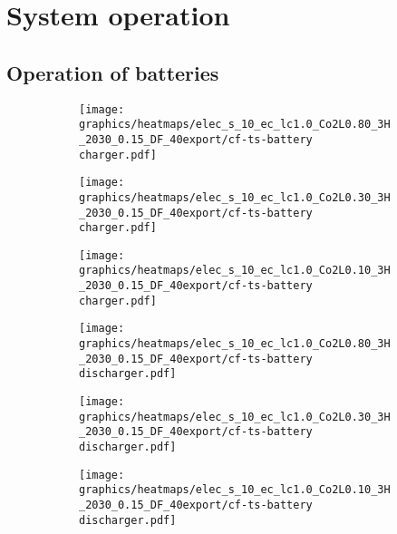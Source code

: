 \section{System operation}

\subsection{Operation of batteries}


\begin{figure}[h]
    \centering
        \begin{subfigure}[h]{0.33\textwidth}
            \centering
        \texttt{[image: graphics/heatmaps/elec\_s\_10\_ec\_lc1.0\_Co2L0.80\_3H\_2030\_0.15\_DF\_40export/cf-ts-battery charger.pdf]}
    \end{subfigure}
    \begin{subfigure}[h]{0.33\textwidth}
        \centering
        \texttt{[image: graphics/heatmaps/elec\_s\_10\_ec\_lc1.0\_Co2L0.30\_3H\_2030\_0.15\_DF\_40export/cf-ts-battery charger.pdf]}
    \end{subfigure}
    \begin{subfigure}[h]{0.33\textwidth}
        \centering
        \texttt{[image: graphics/heatmaps/elec\_s\_10\_ec\_lc1.0\_Co2L0.10\_3H\_2030\_0.15\_DF\_40export/cf-ts-battery charger.pdf]}
    \end{subfigure}


    \begin{subfigure}[h]{0.33\textwidth}
        \centering
        \texttt{[image: graphics/heatmaps/elec\_s\_10\_ec\_lc1.0\_Co2L0.80\_3H\_2030\_0.15\_DF\_40export/cf-ts-battery discharger.pdf]}
    \end{subfigure}
    \begin{subfigure}[h]{0.33\textwidth}
        \centering
        \texttt{[image: graphics/heatmaps/elec\_s\_10\_ec\_lc1.0\_Co2L0.30\_3H\_2030\_0.15\_DF\_40export/cf-ts-battery discharger.pdf]}
    \end{subfigure}
    \begin{subfigure}[h]{0.33\textwidth}
        \centering
        \texttt{[image: graphics/heatmaps/elec\_s\_10\_ec\_lc1.0\_Co2L0.10\_3H\_2030\_0.15\_DF\_40export/cf-ts-battery discharger.pdf]}
        
    \end{subfigure}



\end{figure}
